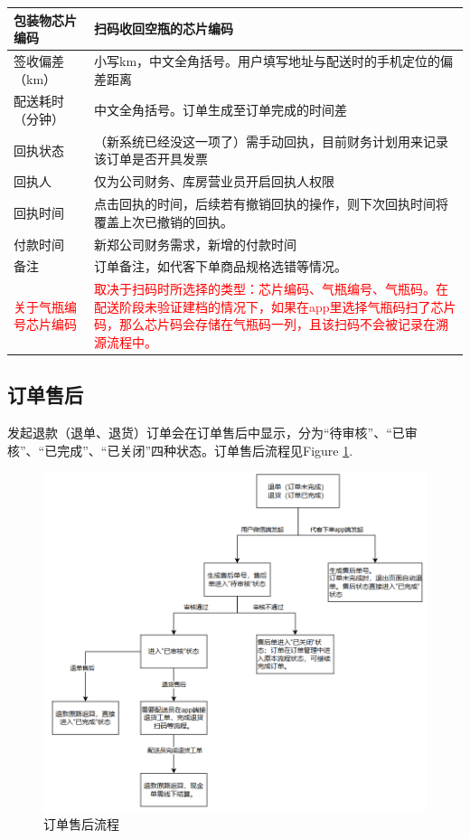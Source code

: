 \documentclass[UTF8]{ctexart}
\begin{document}
\begin{longtable}[h!]{ | m{3cm} | m{12cm} | }
		\hline
		包装物芯片编码& 扫码收回空瓶的芯片编码\\
		\hline
		签收偏差（km）& 小写km，中文全角括号。用户填写地址与配送时的手机定位的偏差距离\\
		\hline
		配送耗时（分钟）& 中文全角括号。订单生成至订单完成的时间差\\
		\hline
		回执状态& （新系统已经没这一项了）需手动回执，目前财务计划用来记录该订单是否开具发票\\
		\hline
		回执人	& 仅为公司财务、库房营业员开启回执人权限 \\
		\hline
		回执时间& 点击回执的时间，后续若有撤销回执的操作，则下次回执时间将覆盖上次已撤销的回执。\\
		\hline
		付款时间& 新郑公司财务需求，新增的付款时间\\
		\hline
		备注& 订单备注，如代客下单商品规格选错等情况。\\
		\hline
		\textcolor{red}{关于气瓶编号芯片编码}& \textcolor{red}{取决于扫码时所选择的类型：芯片编码、气瓶编号、气瓶码。在配送阶段未验证建档的情况下，如果在app里选择气瓶码扫了芯片码，那么芯片码会存储在气瓶码一列，且该扫码不会被记录在溯源流程中。}\\
		\hline

\end{longtable}


\subsection{订单售后}

发起退款（退单、退货）订单会在订单售后中显示，分为“待审核”、“已审核”、“已完成”、“已关闭”四种状态。订单售后流程见Figure \ref{fig:chargeback}.

\begin{figure}[h]
	\centering
	\includegraphics[width=1\linewidth]{dlh_tutorial_figs/chargeback}
	\caption{订单售后流程}
	\label{fig:chargeback}
\end{figure}
\end{document}
